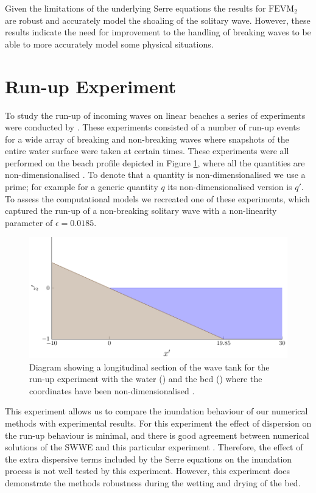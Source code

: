 Given the limitations of the underlying Serre equations the results for $\text{FEVM}_2$ are robust and accurately model the shoaling of the solitary wave. However, these results indicate the need for improvement to the handling of breaking waves to be able to more accurately model some physical situations. 

\section{Run-up Experiment}
To study the run-up of incoming waves on linear beaches a series of experiments were conducted by \citet{Synolakis-1987-523}. These experiments consisted of a number of run-up events for a wide array of breaking and non-breaking waves where snapshots of the entire water surface were taken at certain times. These experiments were all performed on the beach profile depicted in Figure \ref{fig:SynolakisWT}, where all the quantities are non-dimensionalised \cite{Synolakis-1987-523}. To denote that a quantity is non-dimensionalised we use a prime; for example for a generic quantity $q$ its non-dimensionalised version is $q'$. To assess the computational models we recreated one of these experiments, which captured the run-up of a non-breaking solitary wave with a non-linearity parameter of $\epsilon = 0.0185$.
\begin{figure}
	\centering
	\includegraphics[width=\textwidth]{./chp6/figures/Experiment/Synolakis/WavetankArtifical.pdf}
	\caption{Diagram showing a longitudinal section of the wave tank for the run-up experiment with the water () and the bed () where the coordinates have been non-dimensionalised \cite{Synolakis-1987-523}.}
	\label{fig:SynolakisWT}
\end{figure}

This experiment allows us to compare the inundation behaviour of our numerical methods with experimental results. For this experiment the effect of dispersion on the run-up behaviour is minimal, and there is good agreement between numerical solutions of the SWWE and this particular experiment \cite{Bollermann-etal-2011-271}. Therefore, the effect of the extra dispersive terms included by the Serre equations on the inundation process is not well tested by this experiment. However, this experiment does demonstrate the methods robustness during the wetting and drying of the bed. 

